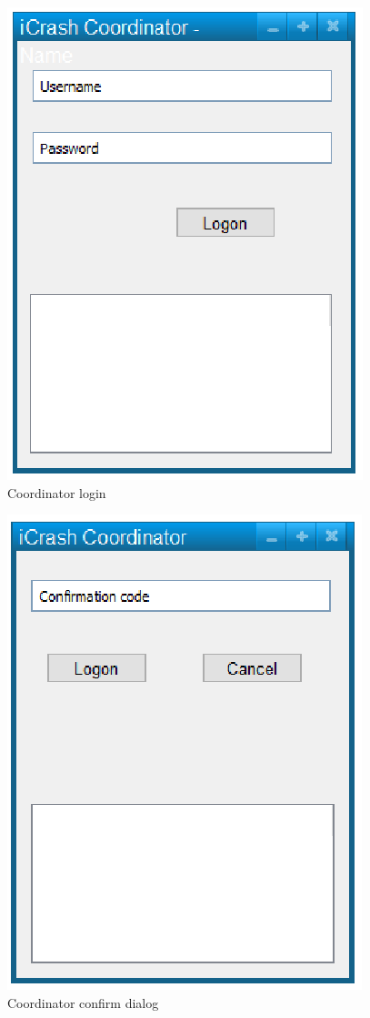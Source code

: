 \begin{figure}
  \centering
    \includegraphics{images/mockups/feature1-login/CoordinatorLogon.eps}
  \caption{Coordinator login}
  \label{fig:CoordinatorLogin}
\end{figure}


\begin{figure}
  \centering
    \includegraphics{images/mockups/feature1-login/CoordinatorConfirm.eps}
  \caption{Coordinator confirm dialog}
  \label{fig:CoordinatorConfirm}
\end{figure}


